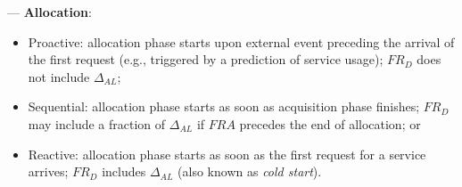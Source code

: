 
--- \textbf{Allocation}:


\begin{itemize}

\item Proactive: allocation phase starts upon external event preceding the arrival of the first request (e.g., triggered by a prediction of service usage); $FR_D$ does not include $\Delta_{AL}$;

\item Sequential: allocation phase starts as soon as acquisition phase finishes; $FR_D$ may include a fraction of $\Delta_{AL}$ if $FRA$ precedes the end of allocation; or

\item Reactive: allocation phase starts as soon as the first request for a service arrives; $FR_D$ includes $\Delta_{AL}$ (also known as \textit{cold start}).

\end{itemize}

%
%
%
%



%
%
%


